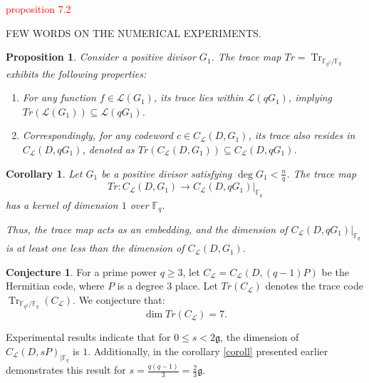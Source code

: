 \documentclass[11pt]{amsart}
\theoremstyle{plain}
\newtheorem{proposition}[theorem]{Proposition}
\newtheorem*{corollary}{Corollary}
\theoremstyle{definition}
\newtheorem{conjecture}{Conjecture}[section]
\theoremstyle{remark}
\newcommand{\g}{\mathfrak{g}}
\DeclareMathOperator{\trace}{Tr}
\newcommand{\calC}{C}
\begin{document}
\textcolor{red}{proposition 7.2 }


FEW WORDS ON THE NUMERICAL EXPERIMENTS.



\begin{proposition}
	Consider a positive divisor $G_1$. The trace map $Tr = \trace_{\mathbb{F}_{q^2} / \mathbb{F}_q}$ exhibits the following properties:
	\begin{enumerate}
		\item For any function $f \in \mathcal{L}(G_1)$, its trace lies within $\mathcal{L}(qG_1)$, implying $Tr(\mathcal{L}(G_1)) \subseteq \mathcal{L}(qG_1)$.
		\item Correspondingly, for any codeword $c \in C_{\mathcal{L}}(D,G_1)$, its trace also resides in $C_{\mathcal{L}}(D,qG_1)$, denoted as $Tr(C_{\mathcal{L}}(D,G_1)) \subseteq C_{\mathcal{L}}(D,qG_1)$.
	\end{enumerate}
\end{proposition}

\begin{corollary}
	Let $G_1$ be a positive divisor satisfying $\deg G_1 < \frac{n}{q}$. The trace map
	\[ Tr: C_{\mathcal{L}}(D,G_1) \rightarrow C_{\mathcal{L}}(D,qG_1)|_{\mathbb{F}_q} \]
	has a kernel of dimension $1$ over $\mathbb{F}_q$.
	
	Thus, the trace map acts as an embedding, and the dimension of $C_{\mathcal{L}}(D,qG_1)|_{\mathbb{F}_q}$ is at least one less than the dimension of $C_{\mathcal{L}}(D,G_1)$.
\end{corollary}


\begin{conjecture} 
	For a prime power $q \geq 3$, let  $\calC_{\mathcal{L}}=\calC_{\mathcal{L}}( D, (q-1)P)$ be the Hermitian code, where $P$ is a degree 3 place. Let $Tr(\calC_{\mathcal{L}})$ denotes the trace code $\trace_{\mathbb{F}_{q^2} / \mathbb{F}_q}(\calC_{\mathcal{L}})$. We conjecture that:
	\[\dim Tr(\calC_{\mathcal{L}}) = 7 .\]
\end{conjecture}


Experimental results indicate that for $0 \leq s < 2\mathfrak{g}$, the dimension of $C_{\mathcal{L}}(D,sP)_{\mid \mathbb{F}_q}$ is $1$. Additionally, in the corollary \ref{coroll} presented earlier demonstrates this result for $ s =\frac{q(q-1)}{3}=\frac{2}{3} \g$.
\end{document}
